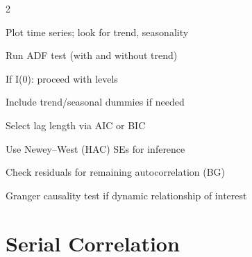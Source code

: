 \documentclass[10pt,a4paper]{article}
\begin{document}
\begin{tcolorbox}[checklist]
\begin{multicols}{2}
\begin{checklist}
  \item Plot time series; look for trend, seasonality
  \item Run ADF test (with and without trend)
  \item If I(0): proceed with levels
  \item Include trend/seasonal dummies if needed
  \item Select lag length via AIC or BIC
  \item Use Newey--West (HAC) SEs for inference
  \item Check residuals for remaining autocorrelation (BG)
  \item Granger causality test if dynamic relationship of interest
\end{checklist}
\end{multicols}
\end{tcolorbox}

\newpage

\section{Serial Correlation}
\end{document}
